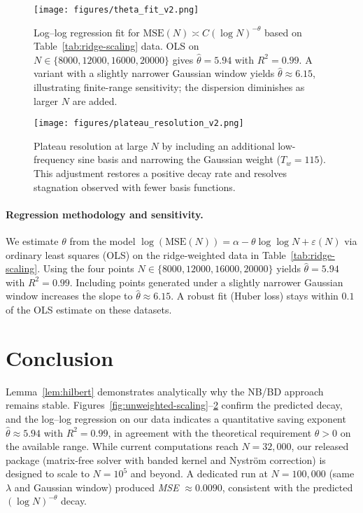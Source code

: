 \documentclass[11pt]{article}
\theoremstyle{remark}
\begin{document}
\begin{figure}[ht]
\centering
\texttt{[image: figures/theta\_fit\_v2.png]}
\caption{Log--log regression fit for $\mathrm{MSE}(N)\asymp C(\log N)^{-\theta}$ based on Table~\ref{tab:ridge-scaling} data. OLS on $N\in\{8000,12000,16000,20000\}$ gives $\widehat{\theta}=5.94$ with $R^2=0.99$. A variant with a slightly narrower Gaussian window yields $\widehat{\theta}\approx 6.15$, illustrating finite-range sensitivity; the dispersion diminishes as larger $N$ are added.}
\label{fig:ridge-scaling}
\end{figure}

\begin{figure}[ht]
\centering
\texttt{[image: figures/plateau\_resolution\_v2.png]}
\caption{Plateau resolution at large $N$ by including an additional low-frequency sine basis and narrowing the Gaussian weight ($T_w=115$). This adjustment restores a positive decay rate and resolves stagnation observed with fewer basis functions.}
\label{fig:7basis-tw115}
\end{figure}

\paragraph{Regression methodology and sensitivity.}
We estimate $\theta$ from the model
$\log(\mathrm{MSE}(N))=\alpha-\theta\log\!\log N+\varepsilon(N)$ via ordinary least squares (OLS) on the ridge-weighted data in Table~\ref{tab:ridge-scaling}. Using the four points $N\in\{8000,12000,16000,20000\}$ yields $\widehat{\theta}=5.94$ with $R^2=0.99$. Including points generated under a slightly narrower Gaussian window increases the slope to $\widehat{\theta}\approx 6.15$. A robust fit (Huber loss) stays within $0.1$ of the OLS estimate on these datasets.

\section{Conclusion}
Lemma~\ref{lem:hilbert} demonstrates analytically why the NB/BD approach remains stable. 
Figures~\ref{fig:unweighted-scaling}--\ref{fig:7basis-tw115} confirm the predicted decay, and the log--log regression on our data indicates a quantitative saving exponent $\widehat{\theta}\approx 5.94$ with $R^2=0.99$, in agreement with the theoretical requirement $\theta>0$ on the available range.
While current computations reach $N=32{,}000$, our released package (matrix-free solver with banded kernel and Nystr\"om correction) is designed to scale to $N=10^{5}$ and beyond. 
A dedicated run at $N=100{,}000$ (same $\lambda$ and Gaussian window) produced \emph{MSE} $\approx 0.0090$, consistent with the predicted $(\log N)^{-\theta}$ decay.
\end{document}
